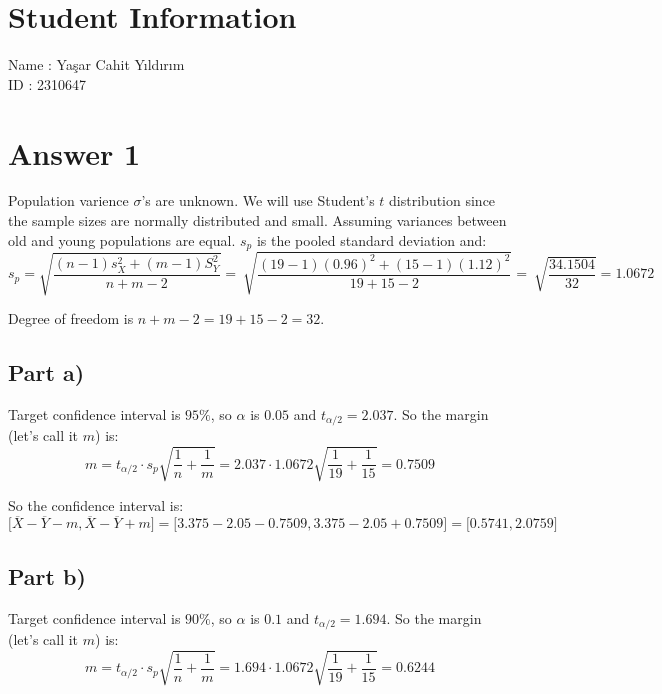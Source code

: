 \documentclass[12pt]{article}
\begin{document}
\vspace*{\fill}
\begingroup
\centering

\section*{Student Information}

Name : Yaşar Cahit Yıldırım \\

ID : 2310647 \\

\endgroup
\vspace*{\fill}

\newpage

\section*{Answer 1}
Population varience $\sigma$'s are unknown. We will use Student's $t$ distribution since the sample sizes are normally distributed and small. Assuming variances between old and young populations are equal. $s_p$ is the pooled standard deviation and:
$$s_p = \sqrt{\frac{(n-1)s_X^2 + (m-1)S_Y^2}{n+m-2}} = \
    \sqrt{\frac{(19-1)(0.96)^2 + (15-1)(1.12)^2}{19+15-2}} = \
    \sqrt{\frac{34.1504}{32}} = 1.0672$$

Degree of freedom is $n+m-2 = 19+15-2 = 32$.

\subsection*{Part a)}
Target confidence interval is $95\%$, so $\alpha$ is $0.05$ and $t_{\alpha/2} = 2.037$. So the margin (let's call it $m$) is:
$$m = t_{\alpha/2} \cdot s_p\sqrt{\frac{1}{n} + \frac{1}{m}} = 2.037\cdot 1.0672 \sqrt{\frac{1}{19} + \frac{1}{15}} = 0.7509$$

So the confidence interval is:
$$\bigg[\overline{X} - \overline{Y} - m, \overline{X} - \overline{Y} + m \bigg] = \bigg[3.375 - 2.05 - 0.7509, 3.375 - 2.05 + 0.7509 \bigg] = \bigg[0.5741
, 2.0759 \bigg]$$


\subsection*{Part b)}
Target confidence interval is $90\%$, so $\alpha$ is $0.1$ and $t_{\alpha/2} = 1.694$. So the margin (let's call it $m$) is:
$$m = t_{\alpha/2} \cdot s_p\sqrt{\frac{1}{n} + \frac{1}{m}} = 1.694\cdot 1.0672 \sqrt{\frac{1}{19} + \frac{1}{15}} = 0.6244$$
\end{document}

